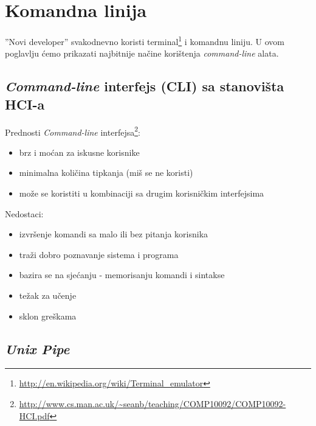 \documentclass[times, utf8, seminar]{fit}
\begin{document}
\chapter{Komandna linija}

''Novi developer'' svakodnevno koristi terminal\footnote{\url{http://en.wikipedia.org/wiki/Terminal_emulator}} i komandnu liniju. U ovom poglavlju ćemo prikazati najbitnije načine korištenja \emph{command-line} alata.

\section{\emph{Command-line} interfejs (CLI) sa stanovišta HCI-a}
\label{sec:cli_hci}
Prednosti \emph{Command-line} interfejsa\footnote{\url{http://www.cs.man.ac.uk/~seanb/teaching/COMP10092/COMP10092-HCI.pdf}}:
\begin{itemize}
 \item brz i moćan za iskusne korisnike
 \item minimalna količina tipkanja (miš se ne koristi)
 \item može se koristiti u kombinaciji sa drugim korisničkim interfejsima
\end{itemize}

Nedostaci:
\begin{itemize}
\item izvršenje komandi sa malo ili bez pitanja korisnika
\item traži dobro poznavanje sistema i programa
\item bazira se na sjećanju - memorisanju komandi i sintakse
\item težak za učenje
\item sklon greškama
\end{itemize}

%
%
%
%
%

\section{\emph{Unix Pipe}}
\end{document}
